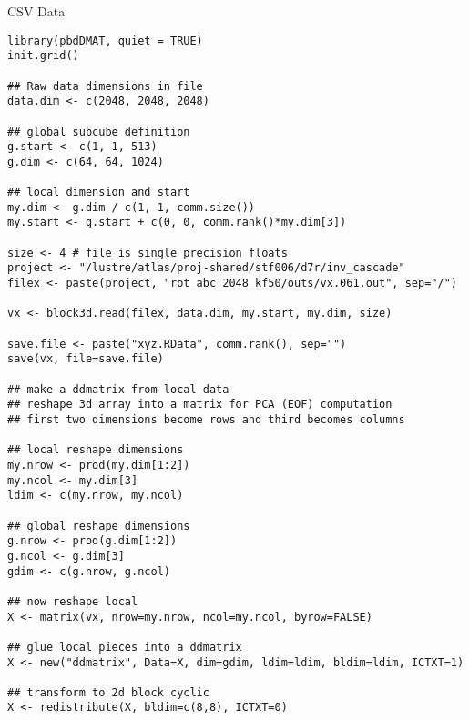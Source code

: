 \begin{frame}
  \begin{exampleblock}{CSV Data}\pause
    \begin{lstlisting}[title=3d Block Binary Reader]
library(pbdDMAT, quiet = TRUE)
init.grid()

## Raw data dimensions in file
data.dim <- c(2048, 2048, 2048)

## global subcube definition
g.start <- c(1, 1, 513)
g.dim <- c(64, 64, 1024)

## local dimension and start
my.dim <- g.dim / c(1, 1, comm.size())
my.start <- g.start + c(0, 0, comm.rank()*my.dim[3])

size <- 4 # file is single precision floats
project <- "/lustre/atlas/proj-shared/stf006/d7r/inv_cascade"
filex <- paste(project, "rot_abc_2048_kf50/outs/vx.061.out", sep="/")

vx <- block3d.read(filex, data.dim, my.start, my.dim, size)

save.file <- paste("xyz.RData", comm.rank(), sep="")
save(vx, file=save.file)

## make a ddmatrix from local data
## reshape 3d array into a matrix for PCA (EOF) computation
## first two dimensions become rows and third becomes columns

## local reshape dimensions
my.nrow <- prod(my.dim[1:2])
my.ncol <- my.dim[3]
ldim <- c(my.nrow, my.ncol)

## global reshape dimensions
g.nrow <- prod(g.dim[1:2])
g.ncol <- g.dim[3]
gdim <- c(g.nrow, g.ncol)

## now reshape local
X <- matrix(vx, nrow=my.nrow, ncol=my.ncol, byrow=FALSE)

## glue local pieces into a ddmatrix
X <- new("ddmatrix", Data=X, dim=gdim, ldim=ldim, bldim=ldim, ICTXT=1)

## transform to 2d block cyclic
X <- redistribute(X, bldim=c(8,8), ICTXT=0)
    \end{lstlisting}
  \end{exampleblock}
\end{frame}

